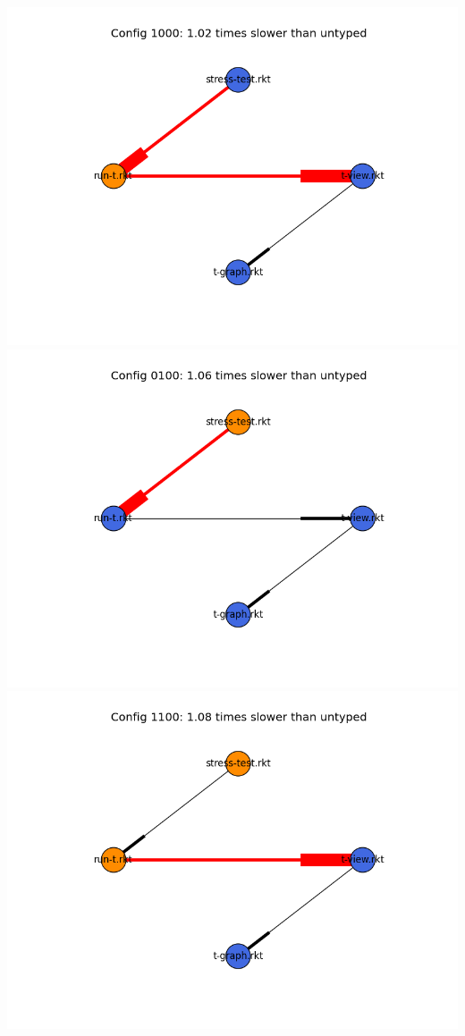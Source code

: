\documentclass{article}
\begin{document}
\includegraphics[width=\textwidth]{mbta-fixed-04-25-module-graph-1000.png}
\includegraphics[width=\textwidth]{mbta-fixed-04-25-module-graph-0100.png}
\includegraphics[width=\textwidth]{mbta-fixed-04-25-module-graph-1100.png}
\end{document}
